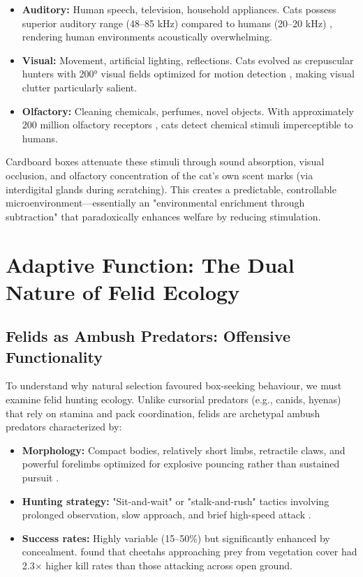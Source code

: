 \documentclass[12pt,a4paper]{article}
\begin{document}
\begin{itemize}
    \item \textbf{Auditory:} Human speech, television, household appliances. Cats possess superior auditory range (48–85 kHz) compared to humans (20–20 kHz) \citep{heffner1985}, rendering human environments acoustically overwhelming.
    
    \item \textbf{Visual:} Movement, artificial lighting, reflections. Cats evolved as crepuscular hunters with 200° visual fields optimized for motion detection \citep{loop1987}, making visual clutter particularly salient.
    
    \item \textbf{Olfactory:} Cleaning chemicals, perfumes, novel objects. With approximately 200 million olfactory receptors \citep{miyazaki2006}, cats detect chemical stimuli imperceptible to humans.
\end{itemize}

Cardboard boxes attenuate these stimuli through sound absorption, visual occlusion, and olfactory concentration of the cat's own scent marks (via interdigital glands during scratching). This creates a predictable, controllable microenvironment—essentially an "environmental enrichment through subtraction" that paradoxically enhances welfare by reducing stimulation.

\section{Adaptive Function: The Dual Nature of Felid Ecology}

\subsection{Felids as Ambush Predators: Offensive Functionality}

To understand why natural selection favoured box-seeking behaviour, we must examine felid hunting ecology. Unlike cursorial predators (e.g., canids, hyenas) that rely on stamina and pack coordination, felids are archetypal ambush predators characterized by:

\begin{itemize}
    \item \textbf{Morphology:} Compact bodies, relatively short limbs, retractile claws, and powerful forelimbs optimized for explosive pouncing rather than sustained pursuit \citep{ewer1973}.
    
    \item \textbf{Hunting strategy:} "Sit-and-wait" or "stalk-and-rush" tactics involving prolonged observation, slow approach, and brief high-speed attack \citep{leyhausen1979}.
    
    \item \textbf{Success rates:} Highly variable (15–50\%) but significantly enhanced by concealment. \citet{caro1995} found that cheetahs approaching prey from vegetation cover had 2.3× higher kill rates than those attacking across open ground.
\end{itemize}
\end{document}
